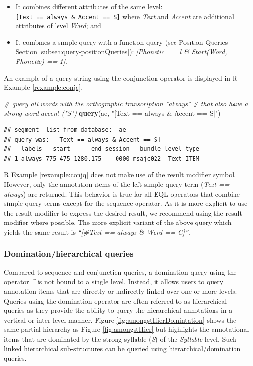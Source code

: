 \documentclass[]{book}
\newenvironment{Shaded}{\begin{snugshade}}{\end{snugshade}}
\newcommand{\CommentTok}[1]{\textcolor[rgb]{0.56,0.35,0.01}{\textit{#1}}}
\newcommand{\KeywordTok}[1]{\textcolor[rgb]{0.13,0.29,0.53}{\textbf{#1}}}
\newcommand{\NormalTok}[1]{#1}
\newcommand{\StringTok}[1]{\textcolor[rgb]{0.31,0.60,0.02}{#1}}
\providecommand{\tightlist}{%
  \setlength{\itemsep}{0pt}\setlength{\parskip}{0pt}}
\theoremstyle{definition}
\theoremstyle{definition}
\theoremstyle{definition}
\theoremstyle{remark}
\begin{document}
\begin{itemize}
\tightlist
\item
  It combines different attributes of the same level:
  \texttt{{[}Text\ ==\ always\ \&\ Accent\ ==\ S{]}} where \emph{Text}
  and \emph{Accent} are additional attributes of level \emph{Word}; and
\item
  It combines a simple query with a function query (see Position Queries
  Section \ref{subsec:query-positionQueries}): \emph{{[}Phonetic == l \&
  Start(Word, Phonetic) == 1{]}}.
\end{itemize}

An example of a query string using the conjunction operator is displayed
in R Example \ref{rexample:conjq}.

\begin{Shaded}
\begin{Highlighting}[]
\CommentTok{# query all words with the orthographic transcription "always"}
\CommentTok{# that also have a strong word accent ("S")}
\KeywordTok{query}\NormalTok{(ae, }\StringTok{"[Text == always & Accent == S]"}\NormalTok{)}
\end{Highlighting}
\end{Shaded}

\begin{verbatim}
## segment  list from database:  ae 
## query was:  [Text == always & Accent == S] 
##   labels   start      end session   bundle level type
## 1 always 775.475 1280.175    0000 msajc022  Text ITEM
\end{verbatim}

R Example \ref{rexample:conjq} does not make use of the result modifier
symbol. However, only the annotation items of the left simple query term
(\emph{Text == always}) are returned. This behavior is true for all EQL
operators that combine simple query terms except for the sequence
operator. As it is more explicit to use the result modifier to express
the desired result, we recommend using the result modifier where
possible. The more explicit variant of the above query which yields the
same result is \emph{``{[}\#Text == always \& Word == C{]}''}.

\hypertarget{subsubsec:query_dominationQueries}{%
\subsubsection{Domination/hierarchical
queries}\label{subsubsec:query_dominationQueries}}

Compared to sequence and conjunction queries, a domination query using
the operator \emph{\^{}} is not bound to a single level. Instead, it
allows users to query annotation items that are directly or indirectly
linked over one or more levels. Queries using the domination operator
are often referred to as hierarchical queries as they provide the
ability to query the hierarchical annotations in a vertical or
inter-level manner. Figure \ref{fig:amongstHierDomintation} shows the
same partial hierarchy as Figure \ref{fig:amongstHier} but highlights
the annotational items that are dominated by the strong syllable
(\emph{S}) of the \emph{Syllable} level. Such linked hierarchical
sub-structures can be queried using hierarchical/domination queries.
\end{document}
